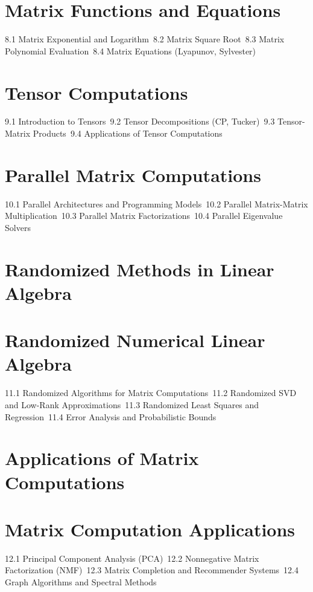 \section{Matrix Functions and Equations}
8.1 Matrix Exponential and Logarithm\
8.2 Matrix Square Root\
8.3 Matrix Polynomial Evaluation\
8.4 Matrix Equations (Lyapunov, Sylvester)\
\section{Tensor Computations}
9.1 Introduction to Tensors\
9.2 Tensor Decompositions (CP, Tucker)\
9.3 Tensor-Matrix Products\
9.4 Applications of Tensor Computations\
\section{Parallel Matrix Computations}
10.1 Parallel Architectures and Programming Models\
10.2 Parallel Matrix-Matrix Multiplication\
10.3 Parallel Matrix Factorizations\
10.4 Parallel Eigenvalue Solvers\
\section{Randomized Methods in Linear Algebra}
\section{Randomized Numerical Linear Algebra}
11.1 Randomized Algorithms for Matrix Computations\
11.2 Randomized SVD and Low-Rank Approximations\
11.3 Randomized Least Squares and Regression\
11.4 Error Analysis and Probabilistic Bounds\
\section{Applications of Matrix Computations}
\section{Matrix Computation Applications}
12.1 Principal Component Analysis (PCA)\
12.2 Nonnegative Matrix Factorization (NMF)\
12.3 Matrix Completion and Recommender Systems\
12.4 Graph Algorithms and Spectral Methods\
